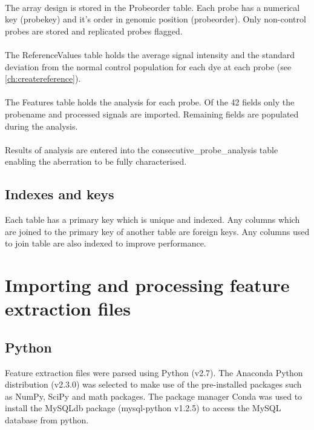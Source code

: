 \paragraph*{}
The array design is stored in the Probeorder table. Each probe has a numerical key (probekey) and it's order in genomic position (probeorder). Only non-control probes are stored and replicated probes flagged.
\paragraph*{}
The ReferenceValues table holds the average signal intensity and the standard deviation from the normal control population for each dye at each probe (see \ref{ch:createreference}).
\paragraph*{}
The Features table holds the analysis for each probe. Of the 42 fields only the probename and processed signals are imported. Remaining fields are populated during the analysis.
\paragraph*{}
Results of analysis are entered into the consecutive\_probe\_analysis table enabling the aberration to be fully characterised.

\subsection{Indexes and keys}
Each table has a primary key which is unique and indexed. 
Any columns which are joined to the primary key of another table are foreign keys.
Any columns used to join table are also indexed to improve performance.

\section{Importing and processing feature extraction files}
\subsection{Python}
Feature extraction files were parsed using Python (v2.7)\cite{python_software_foundation_python_2010}. The Anaconda Python distribution (v2.3.0) \cite{continuum_why_2016} was selected to make use of the pre-installed packages such as NumPy, SciPy and math packages. The package manager Conda was used to install the MySQLdb package (mysql-python v1.2.5)\cite{dustman2014} to access the MySQL database from python. 
